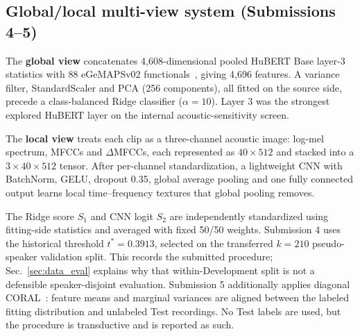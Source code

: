 \subsection{Global/local multi-view system (Submissions 4--5)}

The \textbf{global view} concatenates 4,608-dimensional pooled HuBERT Base
layer-3 statistics with 88 eGeMAPSv02 functionals~\cite{eyben2016egemaps},
giving 4,696 features. A variance filter, StandardScaler and PCA (256
components), all fitted on the source side, precede a class-balanced Ridge
classifier ($\alpha=10$). Layer 3 was the strongest explored HuBERT layer on
the internal acoustic-sensitivity screen.

The \textbf{local view} treats each clip as a three-channel acoustic image:
log-mel spectrum, MFCCs and $\Delta$MFCCs, each represented as $40\times512$
and stacked into a $3\times40\times512$ tensor. After per-channel
standardization, a lightweight CNN with BatchNorm, GELU, dropout 0.35, global
average pooling and one fully connected output learns local time--frequency
textures that global pooling removes.

The Ridge score $S_1$ and CNN logit $S_2$ are independently standardized using
fitting-side statistics and averaged with fixed 50/50 weights. Submission 4
uses the historical threshold $t^*=0.3913$, selected on the transferred
$k=210$ pseudo-speaker validation split. This records the submitted procedure;
Sec.~\ref{sec:data_eval} explains why that within-Development split is not a
defensible speaker-disjoint evaluation. Submission 5 additionally applies
diagonal CORAL~\cite{sun2016coral}: feature means and marginal variances are
aligned between the labeled fitting distribution and unlabeled Test
recordings. No Test labels are used, but the procedure is transductive and is
reported as such.

